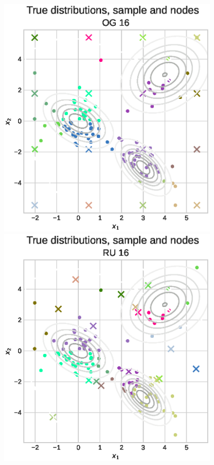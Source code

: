 \documentclass[shortabstract]{iithesis}
\begin{document}
\begin{figure}[!ht]
    \centering
    \includegraphics[scale=0.42]{gaussianHmm_discrete_example_grid.eps}
    \includegraphics[scale=0.42]{gaussianHmm_discrete_example_uniform.eps}

\end{figure}
\end{document}
